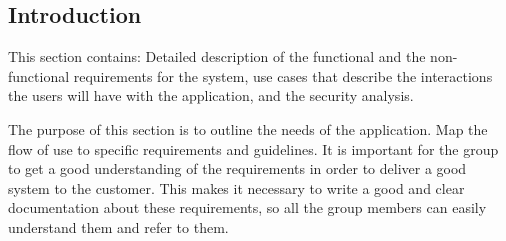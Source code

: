 \subsection{Introduction}
This section contains: Detailed description of the functional and the non-functional requirements
for the system, use cases that describe the interactions the users will have with the
application, and the security analysis.

The purpose of this section is to outline the needs of the application.
Map the flow of use to specific requirements and guidelines.
It is important for the group to get a good understanding of the requirements in order to deliver
a good system to the customer.
This makes it necessary to write a good and clear documentation about these requirements,
so all the group members can easily understand them and refer to them.
